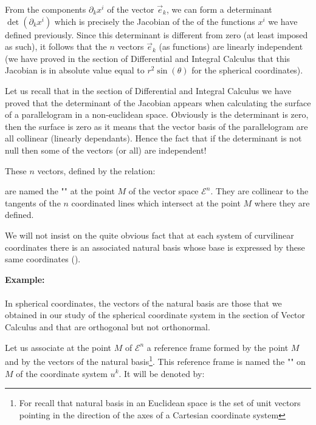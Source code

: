 	From the components $\partial_k x^i$ of the vector $\vec{e}_k$, we can form a determinant $\det(\partial_kx^i)$ which is precisely the Jacobian of the of the functions $x^i$ we have defined previously. Since this determinant is different from zero (at least imposed as such), it follows that the $n$ vectors $\vec{e}_k$ (as functions) are linearly independent (we have proved in the section of Differential and Integral Calculus that this Jacobian is in absolute value equal to $r^2\sin(\theta)$ for the spherical coordinates).
	\begin{tcolorbox}[title=Remark,colframe=black,arc=10pt]
	Let us recall that in the section of Differential and Integral Calculus we have proved that the determinant of the Jacobian appears when calculating the surface of a parallelogram in a non-euclidean space. Obviously is the determinant is zero, then the surface is zero as it means that the vector basis of the parallelogram are all collinear (linearly dependants). Hence the fact that if the determinant is not null then some of the vectors (or all) are independent!
	\end{tcolorbox}
	These $n$ vectors, defined by the relation:
	
	are named the "" at the point $M$ of the vector space $\mathcal{E}^n$. They are collinear to the tangents of the $n$ coordinated lines which intersect at the point $M$ where they are defined.
	
	We will not insist on the quite obvious fact that at each system of curvilinear coordinates there is an associated natural basis whose base is expressed by these same coordinates ().
	\begin{tcolorbox}[colframe=black,colback=white,sharp corners]
	\textbf{{\Large {}}Example:}\\\\
	In spherical coordinates, the vectors of the natural basis are those that we obtained in our study of the spherical coordinate system in the section of Vector Calculus and that are orthogonal but not orthonormal.
	\end{tcolorbox}
	
	Let us associate at the point $M$ of $\mathcal{E}^n$ a reference frame formed by the point $M$ and by the vectors of the natural basis\footnote{For recall that natural basis in an Euclidean space is the set of unit vectors pointing in the direction of the axes of a Cartesian coordinate system}. This reference frame is named the "" on $M$ of the coordinate system $u^k$. It will be denoted by:
	
